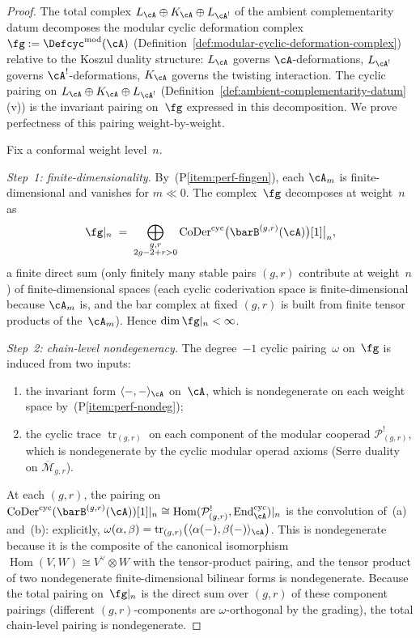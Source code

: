 \begin{proof}
The total complex $L_\cA \oplus K_\cA \oplus L_{\cA^!}$ of the
ambient complementarity datum decomposes the modular cyclic
deformation complex $\fg := \Defcyc^{\mathrm{mod}}(\cA)$
(Definition~\ref{def:modular-cyclic-deformation-complex})
relative to the Koszul duality structure: $L_\cA$ governs
$\cA$-deformations, $L_{\cA^!}$ governs $\cA^!$-deformations,
$K_\cA$ governs the twisting interaction. The cyclic pairing
on $L_\cA \oplus K_\cA \oplus L_{\cA^!}$
(Definition~\ref{def:ambient-complementarity-datum}(v))
is the invariant pairing on~$\fg$ expressed in this
decomposition. We prove perfectness of this pairing
weight-by-weight.

Fix a conformal weight level~$n$.

\smallskip\noindent
\emph{Step~1: finite-dimensionality.}
By~(P\ref{item:perf-fingen}), each $\cA_m$ is finite-dimensional
and vanishes for $m \ll 0$. The complex~$\fg$ decomposes at weight~$n$ as
\[
\fg|_n
\;=\;
\bigoplus_{\substack{g,r \\ 2g-2+r>0}}
\operatorname{CoDer}^{\mathrm{cyc}}\bigl(
\barB^{(g,r)}(\cA)
\bigr)[1]\big|_n,
\]
a finite direct sum (only finitely many stable pairs $(g,r)$
contribute at weight~$n$) of finite-dimensional spaces (each
cyclic coderivation space is finite-dimensional because $\cA_m$ is,
and the bar complex at fixed $(g,r)$ is built from finite tensor
products of the~$\cA_m$). Hence $\dim \fg|_n < \infty$.

\smallskip\noindent
\emph{Step~2: chain-level nondegeneracy.}
The degree~$-1$ cyclic pairing~$\omega$ on~$\fg$
is induced from two inputs:
\begin{enumerate}[label=\textup{(\alph*)}]
\item the invariant form
 $\langle{-},{-}\rangle_\cA$ on~$\cA$, which is nondegenerate on
 each weight space by~(P\ref{item:perf-nondeg});
\item the cyclic trace $\operatorname{tr}_{(g,r)}$ on each component
 of the modular cooperad $\mathcal{P}^!_{(g,r)}$,
 which is nondegenerate by the cyclic
 modular operad axioms (Serre duality on
 $\overline{\mathcal{M}}_{g,r}$).
\end{enumerate}
At each $(g,r)$, the pairing on
$\operatorname{CoDer}^{\mathrm{cyc}}(\barB^{(g,r)}(\cA))[1]|_n
\cong \operatorname{Hom}(\mathcal{P}^!_{(g,r)},
\operatorname{End}^{\mathrm{cyc}}_\cA)|_n$
is the convolution of~(a) and~(b): explicitly,
$\omega(\alpha, \beta)
= \operatorname{tr}_{(g,r)}\bigl(
\langle \alpha(-), \beta(-) \rangle_\cA\bigr)$.
This is nondegenerate because it is the composite of the
canonical isomorphism
$\operatorname{Hom}(V, W) \cong V^\vee \otimes W$
with the tensor-product pairing, and the tensor product of two
nondegenerate finite-dimensional bilinear forms is nondegenerate.
Because the total pairing on~$\fg|_n$ is the direct sum over
$(g,r)$ of these component pairings (different $(g,r)$-components
are $\omega$-orthogonal by the grading), the total chain-level
pairing is nondegenerate.


\end{proof}
